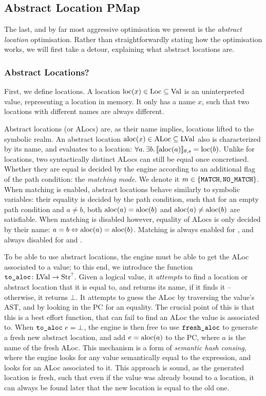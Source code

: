 \subsection{Abstract Location PMap}

The last, and by far most aggressive optimisation we present is the \emph{abstract location} optimisation. Rather than straightforwardly stating how the optimisation works, we will first take a detour, explaining what abstract locations are.

\subsubsection{Abstract Locations?}

First, we define locations. A location $\text{loc}(x)\in\text{Loc}\subseteq\text{Val}$ is an uninterpreted value, representing a location in memory. It only has a name $x$, such that two locations with different names are always different.

Abstract locations (or ALocs) are, as their name implies, locations lifted to the symbolic realm. An abstract location $\text{aloc}(x)\in\text{ALoc}\subseteq\text{LVal}$ also is characterized by its name, and evaluates to a location: $\forall a\ldotp \exists b\ldotp \llbracket\text{aloc}(a)\rrbracket_{\theta,s}=\text{loc}(b)$. Unlike for locations, two syntactically distinct ALocs can still be equal once concretised. Whether they are equal is decided by the engine according to an additional flag of the path condition: the \emph{matching mode}. We denote it $m\in\{\texttt{MATCH},\texttt{NO\_MATCH}\}$. When matching is enabled, abstract locations behave similarly to symbolic variables: their equality is decided by the path condition, such that for an empty path condition and $a\neq b$, both $\text{aloc}(a)=\text{aloc}(b)$ and $\text{aloc}(a)\neq\text{aloc}(b)$ are satisfiable. When matching is disabled however, equality of ALocs is only decided by their name: $a=b\Leftrightarrow \text{aloc}(a)=\text{aloc}(b)$. Matching is always enabled for \consume, and always disabled for \produce{} and \execac.

To be able to use abstract locations, the engine must be able to get the ALoc associated to a value; to this end, we introduce the function $\texttt{to\_aloc}\colon \text{LVal}\rightarrow\text{Str}^?$. Given a logical value, it \emph{attempts} to find a location or abstract location that it is equal to, and returns its name, if it finds it -- otherwise, it returns $\bot$. It attempts to guess the ALoc by traversing the value's AST, and by looking in the PC for an equality. The crucial point of this is that this is a best effort function, that can fail to find an ALoc the value is associated to. When $\texttt{to\_aloc}~e=\bot$, the engine is then free to use $\texttt{fresh\_aloc}$ to generate a fresh new abstract location, and add $e=\text{aloc}(a)$ to the PC, where $a$ is the name of the fresh ALoc. This mechanism is a form of \emph{semantic hash consing}, where the engine looks for any value semantically equal to the expression, and looks for an ALoc associated to it. This approach is sound, as the generated location is fresh, such that even if the value was already bound to a location, it can always be found later that the new location is equal to the old one.

